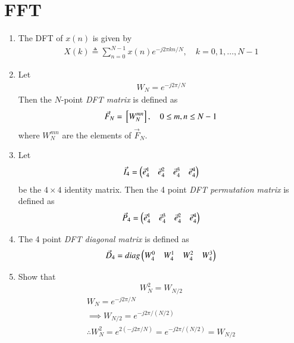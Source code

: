 \documentclass[journal,12pt,twocolumn]{IEEEtran}
\renewcommand\thesection{\arabic{section}}
\begin{document}
\section{FFT}
\begin{enumerate}[label=\arabic*.,ref=\thesection.\theenumi]
	\item The DFT of $x(n)$ is given by
	\begin{align}
		X(k) \triangleq \sum_{n=0}^{N-1} x(n) e^{-j 2 \pi k n / N}, \quad k=0,1, \ldots, N-1
	\end{align}
	\item Let 
	\begin{align}
		W_{N} = e^{-j2\pi/N} 
	\end{align}
	Then the $N$-point {\em DFT matrix} is defined as 
	\begin{align}
		\vec{F}_{N} = {}\left[W_{N}^{mn}\right], \quad 0 \le m,n \le N-1 
	\end{align}
	where $W_{N}^{mn}$ are the elements of $\vec{F}_{N}$.
	\item Let 
	\begin{align}
		\vec{I}_4 = \begin{pmatrix}\vec{e}_4^{1} &\vec{e}_4^{2} &\vec{e}_4^{3} &\vec{e}_4^{4} \end{pmatrix}
	\end{align}
	be the $4\times 4$ identity matrix.  Then the 4 point {\em DFT permutation matrix} is defined as 
	\begin{align}
		\vec{P}_4 = \begin{pmatrix}\vec{e}_4^{1} &\vec{e}_4^{3} &\vec{e}_4^{2} &\vec{e}_4^{4} \end{pmatrix}
	\end{align}
	\item The 4 point {\em DFT diagonal matrix} is defined as 
	\begin{align}
		\vec{D}_4 = diag\begin{pmatrix}W_{4}^{0} & W_{4}^{1} & W_{4}^{2} & W_{4}^{3}\end{pmatrix}
	\end{align}
	\item Show that 
	\begin{equation}
		W_{N}^{2}=W_{N/2}
	\end{equation}
	\solution\begin{align}
		W_{N} = e^{-j2\pi/N}\\
		\implies W_{N/2} = e^{-j2\pi/(N/2)}\\
		\therefore W_{N}^{2} = e^{2 (-j2\pi/N)} = e^{-j2\pi/(N/2)} = W_{N/2}
	\end{align}

\end{enumerate}
\end{document}
